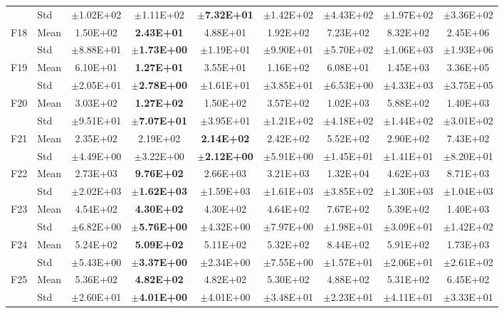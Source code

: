 \begin{table}[htbp]
{\begin{tabular}{clccccccc}
 & Std & $\pm$1.02E+02 & $\pm$1.11E+02 & $\pm$\textbf{7.32E+01} & $\pm$1.42E+02 & $\pm$4.43E+02 & $\pm$1.97E+02 & $\pm$3.36E+02 \\
F18 & Mean & 1.50E+02 & \textbf{2.43E+01} & 4.88E+01 & 1.92E+02 & 7.23E+02 & 8.32E+02 & 2.45E+06 \\
 & Std & $\pm$8.88E+01 & $\pm$\textbf{1.73E+00} & $\pm$1.19E+01 & $\pm$9.90E+01 & $\pm$5.70E+02 & $\pm$1.06E+03 & $\pm$1.93E+06 \\
F19 & Mean & 6.10E+01 & \textbf{1.27E+01} & 3.55E+01 & 1.16E+02 & 6.08E+01 & 1.45E+03 & 3.36E+05 \\
 & Std & $\pm$2.05E+01 & $\pm$\textbf{2.78E+00} & $\pm$1.61E+01 & $\pm$3.85E+01 & $\pm$6.53E+00 & $\pm$4.33E+03 & $\pm$3.75E+05 \\
F20 & Mean & 3.03E+02 & \textbf{1.27E+02} & 1.50E+02 & 3.57E+02 & 1.02E+03 & 5.88E+02 & 1.40E+03 \\
 & Std & $\pm$9.51E+01 & $\pm$\textbf{7.07E+01} & $\pm$3.95E+01 & $\pm$1.21E+02 & $\pm$4.18E+02 & $\pm$1.44E+02 & $\pm$3.01E+02 \\
F21 & Mean & 2.35E+02 & 2.19E+02 & \textbf{2.14E+02} & 2.42E+02 & 5.52E+02 & 2.90E+02 & 7.43E+02 \\
 & Std & $\pm$4.49E+00 & $\pm$3.22E+00 & $\pm$\textbf{2.12E+00} & $\pm$5.91E+00 & $\pm$1.45E+01 & $\pm$1.41E+01 & $\pm$8.20E+01 \\
F22 & Mean & 2.73E+03 & \textbf{9.76E+02} & 2.66E+03 & 3.21E+03 & 1.32E+04 & 4.62E+03 & 8.71E+03 \\
 & Std & $\pm$2.02E+03 & $\pm$\textbf{1.62E+03} & $\pm$1.59E+03 & $\pm$1.61E+03 & $\pm$3.85E+02 & $\pm$1.30E+03 & $\pm$1.04E+03 \\
F23 & Mean & 4.54E+02 & \textbf{4.30E+02} & 4.30E+02 & 4.64E+02 & 7.67E+02 & 5.39E+02 & 1.40E+03 \\
 & Std & $\pm$6.82E+00 & $\pm$\textbf{5.76E+00} & $\pm$4.32E+00 & $\pm$7.97E+00 & $\pm$1.98E+01 & $\pm$3.09E+01 & $\pm$1.42E+02 \\
F24 & Mean & 5.24E+02 & \textbf{5.09E+02} & 5.11E+02 & 5.32E+02 & 8.44E+02 & 5.91E+02 & 1.73E+03 \\
 & Std & $\pm$5.43E+00 & $\pm$\textbf{3.37E+00} & $\pm$2.34E+00 & $\pm$7.55E+00 & $\pm$1.57E+01 & $\pm$2.06E+01 & $\pm$2.61E+02 \\
F25 & Mean & 5.36E+02 & \textbf{4.82E+02} & 4.82E+02 & 5.30E+02 & 4.88E+02 & 5.31E+02 & 6.45E+02 \\
 & Std & $\pm$2.60E+01 & $\pm$\textbf{4.01E+00} & $\pm$4.01E+00 & $\pm$3.48E+01 & $\pm$2.23E+01 & $\pm$4.11E+01 & $\pm$3.33E+01 \\

\end{tabular}}
\end{table}
